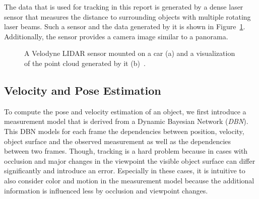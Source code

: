 \documentclass[twoside,a4paper,article]{combine}
\begin{document}
The data that is used for tracking in this report is generated by a
dense laser sensor that measures the distance to surrounding objects
with multiple rotating laser beams. Such a sensor and the data
generated by it is shown in Figure~\ref{fig:lidar}. Additionally, the
sensor provides a camera image similar to a panorama.
\begin{figure}
  \center
  
  \caption{A Velodyne LIDAR sensor mounted on a car (a) and a
    visualization of the point cloud generated by it
    (b)~\cite{arbitrary-object-recognition}.}
  \label{fig:lidar}
\end{figure}

\subsection{Velocity and Pose Estimation}
\label{sub:vel-and-pos-estimation}
To compute the pose and velocity estimation of an object, we first
introduce a measurement model that is derived from a Dynamic Bayesian
Network (\textit{DBN}). This DBN models for each frame the
dependencies between position, velocity, object surface and the
observed measurement as well as the dependencies between two
frames. Though, tracking is a hard
problem because in cases with occlusion and major changes in the
viewpoint the visible object surface can differ significantly and
introduce an error. Especially in these cases, it is intuitive to also
consider color and motion in the measurement model because the additional
information is influenced less by occlusion and viewpoint changes.
\end{document}
